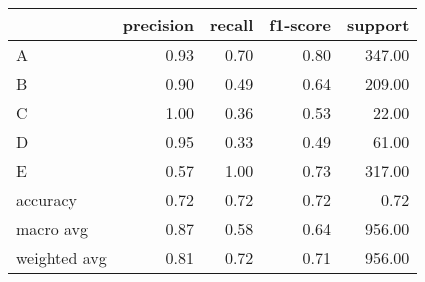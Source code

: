 \begin{tabular}{|l|r|r|r|r|}
\hline
{} &  precision &  recall &  f1-score &  support \\
\hline
A            &       0.93 &    0.70 &      0.80 &   347.00 \\
B            &       0.90 &    0.49 &      0.64 &   209.00 \\
C            &       1.00 &    0.36 &      0.53 &    22.00 \\
D            &       0.95 &    0.33 &      0.49 &    61.00 \\
E            &       0.57 &    1.00 &      0.73 &   317.00 \\
accuracy     &       0.72 &    0.72 &      0.72 &     0.72 \\
macro avg    &       0.87 &    0.58 &      0.64 &   956.00 \\
weighted avg &       0.81 &    0.72 &      0.71 &   956.00 \\
\hline
\end{tabular}
